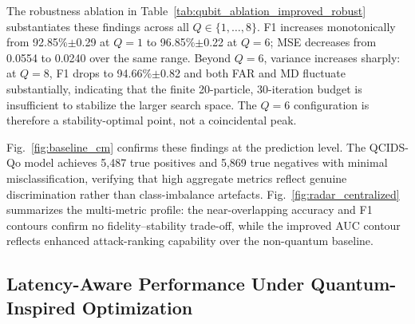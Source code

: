 \documentclass[conference]{IEEEtran}
\begin{document}
The robustness ablation in Table~\ref{tab:qubit_ablation_improved_robust}
substantiates these findings across all $Q\in\{1,\dots,8\}$.
F1 increases monotonically from 92.85\%$\pm$0.29 at $Q{=}1$
to 96.85\%$\pm$0.22 at $Q{=}6$; MSE decreases from 0.0554 to
0.0240 over the same range. Beyond $Q{=}6$, variance increases
sharply: at $Q{=}8$, F1 drops to 94.66\%$\pm$0.82 and both
FAR and MD fluctuate substantially, indicating that the finite
20-particle, 30-iteration budget is insufficient to stabilize
the larger search space. The $Q{=}6$ configuration is therefore
a stability-optimal point, not a coincidental peak.

Fig.~\ref{fig:baseline_cm} confirms these findings at the
prediction level. The QCIDS-Qo model achieves 5,487 true
positives and 5,869 true negatives with minimal
misclassification, verifying that high aggregate metrics
reflect genuine discrimination rather than class-imbalance
artefacts. Fig.~\ref{fig:radar_centralized} summarizes the
multi-metric profile: the near-overlapping accuracy and F1
contours confirm no fidelity--stability trade-off, while the
improved AUC contour reflects enhanced attack-ranking capability
over the non-quantum baseline.



\subsection{Latency-Aware Performance Under Quantum-Inspired
            Optimization}
\label{subsec:obj2_latency}
\end{document}
